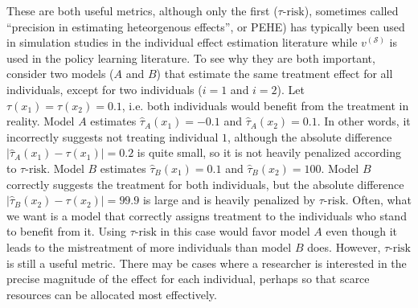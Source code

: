 These are both useful metrics, although only the first ($\tau\text{-risk}$), sometimes called ``precision in estimating heteorgenous effects'', or PEHE) has typically been used in simulation studies in the individual effect estimation literature while $v^{(\mathcal{S})}$ is used in the policy learning literature. To see why they are both important, consider two models ($A$ and $B$) that estimate the same treatment effect for all individuals, except for two individuals ($i=1$ and $i=2$). Let $\tau(x_1) = \tau(x_2) = 0.1$, i.e. both individuals would benefit from the treatment in reality. Model $A$ estimates $\hat\tau_A(x_1) = -0.1$ and $\hat\tau_A(x_2) = 0.1$. In other words, it incorrectly suggests not treating individual $1$, although the absolute difference $|\hat\tau_A(x_1)-\tau(x_1)| = 0.2$ is quite small, so it is not heavily penalized according to $\tau\text{-risk}$. Model $B$ estimates $\hat\tau_B(x_1) = 0.1$ and $\hat\tau_B(x_2) = 100$. Model $B$ correctly suggests the treatment for both individuals, but the absolute difference $|\hat\tau_B(x_2)-\tau(x_2)| = 99.9$ is large and is heavily penalized by $\tau\text{-risk}$. Often, what we want is a model that correctly assigns treatment to the individuals who stand to benefit from it. Using $\tau\text{-risk}$ in this case would favor model $A$ even though it leads to the mistreatment of more individuals than model $B$ does. However, $\tau\text{-risk}$ is still a useful metric. There may be cases where a researcher is interested in the precise magnitude of the effect for each individual, perhaps so that scarce resources can be allocated most effectively. 

